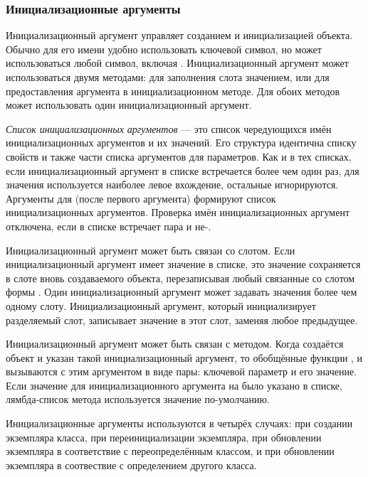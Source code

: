 \subsubsection{Инициализационные аргументы}

Инициализационный аргумент управляет созданием и инициализацией объекта. Обычно
для его имени удобно использовать ключевой символ, но может использоваться любой
символ, включая . Инициализационный аргумент может использоваться двумя
методами: для заполнения слота значением, или для предоставления аргумента в
инициализационном методе. Для обоих методов может использовать один
инициализационный аргумент.

\emph{Список инициализационных аргументов} --- это список чередующихся имён
инициализационных аргументов и их значений. Его структура идентична списку
свойств и также части списка аргументов для  параметров. Как и в тех
списках, если инициализационный аргумент в списке встречается более чем один
раз, для значения используется наиболее левое вхождение, остальные
игнорируются. Аргументы для  (после первого аргумента)
формируют список инициализационных аргументов. Проверка имён инициализационных
аргумент отключена, если в списке встречает пара  и
не-.

Инициализационный аргумент может быть связан со слотом. Если инициализационный
аргумент имеет значение в списке, это значение сохраняется в слоте вновь
создаваемого объекта, перезаписывая любый связанные со слотом формы
. Один инициализационный аргумент может задавать значения более
чем одному слоту. Инициализационный аргумент, который инициализирует разделяемый
слот, записывает значение в этот слот, заменяя любое предыдущее.

Инициализационный аргумент может быть связан с методом. Когда создаётся объект и
указан такой инициализационный аргумент, то обобщённые функции
,  и 
вызываются с этим аргументом в виде пары: ключевой параметр и его значение.
Если значение для инициализационного аргумента на было указано в списке,
лямбда-список метода используется значение по-умолчанию.

Инициализационные аргументы используются в четырёх случаях: при создании
экземпляра класса, при переинициализации экземпляра, при обновлении экземпляра
в соответствие с переопределённым классом, и при обновлении экземпляра в
соотвествие с определением другого класса.

